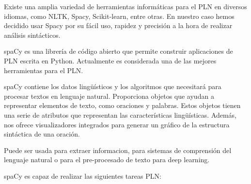 Existe una amplia variedad de herramientas informáticas para el PLN en diversos idiomas, como NLTK, Spacy, Scikit-learn, entre otras. En nuestro caso hemos decidido usar Spacy por su fácil uso, rapidez y precisión a la hora de realizar análisis sintácticos.

spaCy es una librería de código abierto que permite construir aplicaciones de PLN escrita en Python. Actualmente es considerada una de las mejores herramientas para el PLN. 


spaCy contiene los datos lingüísticos y los algoritmos que necesitará para procesar textos en lenguaje natural. Proporciona objetos que ayudan a representar elementos de texto, como oraciones y palabras. Estos objetos tienen una serie de atributos que representan las características lingüísticas. Además, nos ofrece visualizadores integrados para generar un gráfico de la estructura sintáctica de una oración.

Puede ser usada para extraer informacion, para sistemas de comprensión del lenguaje natural o para el pre-procesado de texto para deep learning.

spaCy es capaz de realizar las siguientes tareas PLN:

